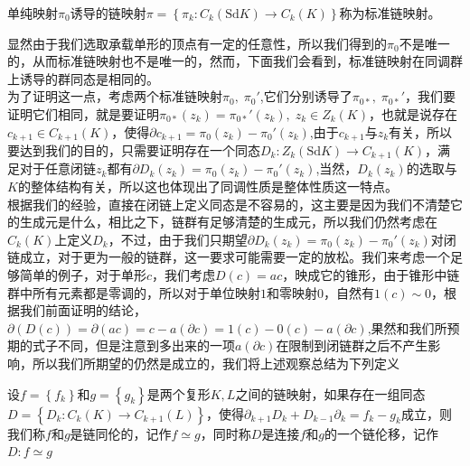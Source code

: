 \begin{definition}
单纯映射$\pi_{0}$诱导的链映射$\pi=\left\{\pi_{k}:C_{k}(\text{Sd}K)\rightarrow C_{k}(K)\right\}$称为标准链映射。
\end{definition}
显然由于我们选取承载单形的顶点有一定的任意性，所以我们得到的$\pi_{0}$不是唯一的，从而标准链映射也不是唯一的，然而，下面我们会看到，标准链映射在同调群上诱导的群同态是相同的。\\
为了证明这一点，考虑两个标准链映射$\pi_{0},\;\pi_{0}'$,它们分别诱导了$\pi_{0*},\;\pi_{0*}'$，我们要证明它们相同，就是要证明$\pi_{0*}(z_{k})=\pi_{0*}'(z_{k}),\;z_{k}\in Z_{k}(K)$，也就是说存在$c_{k+1}\in C_{k+1}(K)$，使得$\partial c_{k+1}=\pi_{0}(z_{k})-\pi_{0}'(z_{k})$,由于$c_{k+1}$与$z_{k}$有关，所以要达到我们的目的，只需要证明存在一个同态$D_{k}:Z_{k}(\text{Sd}K)\rightarrow C_{k+1}(K)$，满足对于任意闭链$z_{k}$都有$\partial D_{k}(z_{k})=\pi_{0}(z_{k})-\pi_{0}'(z_{k})$,当然，$D_{k}(z_{k})$的选取与$K$的整体结构有关，所以这也体现出了同调性质是整体性质这一特点。\\
根据我们的经验，直接在闭链上定义同态是不容易的，这主要是因为我们不清楚它的生成元是什么，相比之下，链群有足够清楚的生成元，所以我们仍然考虑在$C_{k}(K)$上定义$D_{k}$，不过，由于我们只期望$\partial D_{k}(z_{k})=\pi_{0}(z_{k})-\pi_{0}'(z_{k})$对闭链成立，对于更为一般的链群，这一要求可能需要一定的放松。我们来考虑一个足够简单的例子，对于单形$c$，我们考虑$D(c)=ac$，映成它的锥形，由于锥形中链群中所有元素都是零调的，所以对于单位映射$1$和零映射$0$，自然有$1(c)\sim 0$，根据我们前面证明的结论，$\partial(D(c))=\partial(ac)=c-a(\partial c)=1(c)-0(c)-a(\partial c)$,果然和我们所预期的式子不同，但是注意到多出来的一项$a(\partial c)$在限制到闭链群之后不产生影响，所以我们所期望的仍然是成立的，我们将上述观察总结为下列定义
\begin{definition}
设$f=\left\{f_{k}\right\}$和$g=\left\{g_{k}\right\}$是两个复形$K,L$之间的链映射，如果存在一组同态$D=\left\{D_{k}:C_{k}(K)\rightarrow C_{k+1}(L)\right\}$，使得$\partial_{k+1}D_{k}+D_{k-1}\partial_{k}=f_{k}-g_{k}$成立，则我们称$f$和$g$是链同伦的，记作$f\simeq g$，同时称$D$是连接$f$和$g$的一个链伦移，记作$D:f\simeq g$
\end{definition}

